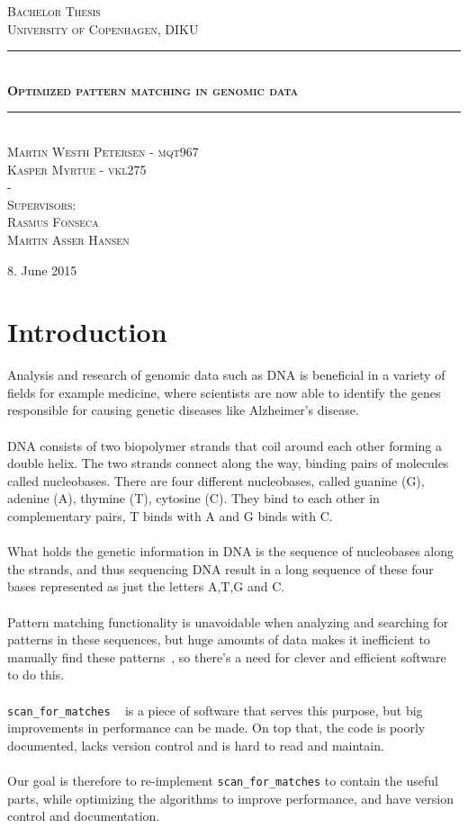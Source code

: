 \documentclass[12pt]{article}
\newcommand{\HRule}{\rule{\linewidth}{0.5mm}}
\newcommand{\scm}{\texttt{scan\_for\_matches} }
\begin{document}
\begin{titlepage}
\begin{center}

\textsc{\Large Bachelor Thesis \\[0.2in]
University of Copenhagen, DIKU}
\HRule \\[0.4cm]
\textsc{\LARGE \bfseries Optimized pattern matching in genomic data}\\[0.1cm]
\HRule \\[1.2cm]
\textsc{\large Martin Westh Petersen - mqt967 \\ Kasper Myrtue - vkl275 \\ -\\
Supervisors: \\ Rasmus Fonseca \\ Martin Asser Hansen}\\[1.0cm]
\end{center}
\begin{center}
\vfill
{\large 8. June 2015}
\end{center}
\end{titlepage}
\tableofcontents \newpage
\section{Introduction}
\nocite{*}
Analysis and research of genomic data such as DNA is beneficial in a variety of fields for example medicine, where
scientists are now able to identify the genes responsible for causing genetic diseases like 
Alzheimer's disease.~\cite{gen} \\ \\
DNA consists of two biopolymer strands that coil around each other forming a double helix. The two strands
connect along the way, binding pairs of molecules called nucleobases. There are four different nucleobases, called
guanine (G), adenine (A), thymine (T), cytosine (C). They bind to each other in complementary pairs, T binds with A and
G binds with C.~\cite{dna} \\ \\
What holds the genetic information in DNA is the sequence of nucleobases along the strands, and thus sequencing DNA
result in a long sequence of these four bases represented as just the letters A,T,G and C. \\ \\
Pattern matching functionality is unavoidable when analyzing and searching for patterns in these sequences, but
huge amounts of data makes it inefficient to manually find these patterns~\cite{gcn}, so there's a need for clever
and efficient software to do this. \\ \\
\scm ~\cite{scm} is a piece of software that serves this purpose, but big improvements in performance can be made.
On top that, the code is poorly documented, lacks version control and is hard to read and maintain. \\ \\
Our goal is therefore to re-implement \scm to contain the useful parts,
while optimizing the algorithms to improve performance, and have version control and documentation.
\end{document}
